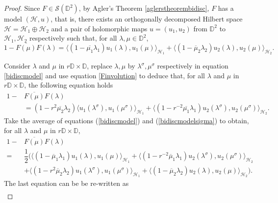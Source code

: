 \documentclass[10pt,a4paper]{amsart}
\begin{document}
\begin{proof}
Since $F \in \mathcal{S}(\mathbb{D}^{2})$, by Agler's Theorem \ref{aglerstheorembidisc}, $F$ has a model $(\mathcal{H},u)$, that is, there exists an orthogonally decomposed Hilbert space $\mathcal{H}=\mathcal{H}_{1}\oplus\mathcal{H}_{2}$ and a pair of holomorphic maps $u=(u_{1},u_{2})$ from $\mathbb{D}^{2}$ to $\mathcal{H}_{1},\mathcal{H}_{2}$ respectively such that, for all $\lambda, \mu \in \mathbb{D}^{2}$, 
\begin{equation}\label{bidiscmodel}
1-\overline{F(\mu)}{F(\lambda)}=\langle(1-\overline{\mu_{1}}\lambda_{1}) u_{1}({\lambda}),u_{1}({\mu})\rangle_{\mathcal{H}_{1}}+\langle(1-\overline{\mu}_{2}\lambda_{2}) u_{2}({\lambda}),u_{2}({\mu})\rangle_{\mathcal{H}_{2}}.
\end{equation}

Consider $\lambda$ and $\mu$ in $ r\mathbb{D}\times \mathbb{D}$,
replace $\lambda, \mu$ by $\lambda^{\sigma}, \mu^{\sigma}$ respectively in equation \eqref{bidiscmodel} and use equation \eqref{Finvolution} to deduce that, for all $\lambda$ and $ \mu $ in $ r\mathbb{D}\times \mathbb{D}$, the following equation holds
\begin{align}\label{bidiscmodelsigma}
1-&\overline{F(\mu)}{F(\lambda)} \nonumber\\
&=(1-r^{2}\overline{\mu_{2}}\lambda_{2})\langle{u_{1}({\lambda^{\sigma}}),u_{1}({\mu}^{\sigma})\rangle_{\mathcal{H}_{1}}}+\langle{(1-r^{-2}\overline{\mu_{1}}\lambda_{1})u_{2}({\lambda^{\sigma}}),u_{2}({\mu^{\sigma}})\rangle_{\mathcal{H}_{2}}}.
\end{align}
Take the average of equations (\ref{bidiscmodel}) and (\ref{bidiscmodelsigma}) to obtain, for  all $\lambda$ and $\mu$ in $r\mathbb{D}\times\mathbb{D}$, 
\begin{align*}
1-& \overline{F(\mu)}F(\lambda) \\
= & \dfrac{1}{2}\Bigg(\Big\langle(1-\overline\mu_{1}\lambda_{1})u_{1}({\lambda}),u_{1}(\mu)\Big\rangle_{\mathcal{H}_{1}}+ \Big\langle (1-r^{-2}\overline\mu_{1}\lambda_{1})u_{2}({\lambda^{\sigma}}), u_{2}(\mu^{\sigma})\Big\rangle_{\mathcal{H}_{2}} \\
&+  \Big\langle(1-r^{2}\overline{\mu}_{2}\lambda_{2}) u_{1}(\lambda^{\sigma}), u_{1}(\mu^{\sigma})\Big\rangle_{\mathcal{H}_{1}}+\Big\langle(1-\overline{\mu}_{2}\lambda_{2})u_{2}(\lambda), u_{2}(\mu)\Big\rangle_{\mathcal{H}_{2}}\Bigg). 
\end{align*}
The last equation can be  be re-written as
\begin{align}

\end{align}
\end{proof}
\end{document}
